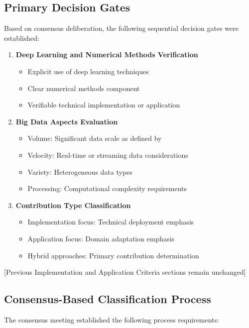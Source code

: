 \documentclass[a4paper,12pt]{article}
\begin{document}
\begin{enumerate}
\subsection{Primary Decision Gates}
Based on consensus deliberation, the following sequential decision gates were established:

\begin{enumerate}
    \item \textbf{Deep Learning and Numerical Methods Verification}
    \begin{itemize}
        \item Explicit use of deep learning techniques
        \item Clear numerical methods component
        \item Verifiable technical implementation or application
    \end{itemize}
    
    \item \textbf{Big Data Aspects Evaluation}
    \begin{itemize}
        \item Volume: Significant data scale as defined by \cite{laney2001data}
        \item Velocity: Real-time or streaming data considerations
        \item Variety: Heterogeneous data types
        \item Processing: Computational complexity requirements
    \end{itemize}
    
    \item \textbf{Contribution Type Classification}
    \begin{itemize}
        \item Implementation focus: Technical deployment emphasis
        \item Application focus: Domain adaptation emphasis
        \item Hybrid approaches: Primary contribution determination
    \end{itemize}
\end{enumerate}

[Previous Implementation and Application Criteria sections remain unchanged]

\subsection{Consensus-Based Classification Process}
The consensus meeting established the following process requirements:


\end{enumerate}
\end{document}
